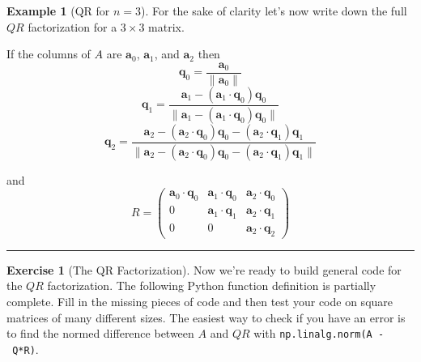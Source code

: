 \documentclass[
]{book}
\theoremstyle{definition}
\theoremstyle{definition}
\newtheorem{example}{Example}[chapter]
\theoremstyle{definition}
\newtheorem{exercise}{Exercise}[chapter]
\theoremstyle{remark}
\begin{document}
\begin{example}[QR for $n=3$]
\protect\hypertarget{exm:unnamed-chunk-349}{}{\label{exm:unnamed-chunk-349} {} }For the sake of clarity let's now write down the full \(QR\) factorization for a \(3 \times 3\) matrix.

If the columns of \(A\) are \(\boldsymbol{a}_0\), \(\boldsymbol{a}_1\), and \(\boldsymbol{a}_2\) then
\[ \boldsymbol{q}_0 = \frac{\boldsymbol{a}_0}{\|\boldsymbol{a}_0\|} \]
\[ \boldsymbol{q}_1 = \frac{ \boldsymbol{a}_1 - \left( \boldsymbol{a}_1 \cdot \boldsymbol{q}_0 \right) \boldsymbol{q}_0 }{\| \boldsymbol{a}_1 - \left( \boldsymbol{a}_1 \cdot \boldsymbol{q}_0 \right) \boldsymbol{q}_0 \|} \]
\[ \boldsymbol{q}_2 = \frac{ \boldsymbol{a}_2 - \left( \boldsymbol{a}_2 \cdot \boldsymbol{q}_0 \right) \boldsymbol{q}_0 - \left( \boldsymbol{a}_2 \cdot \boldsymbol{q}_1 \right) \boldsymbol{q}_1}{\| \boldsymbol{a}_2 - \left( \boldsymbol{a}_2 \cdot \boldsymbol{q}_0 \right) \boldsymbol{q}_0  - \left( \boldsymbol{a}_2 \cdot \boldsymbol{q}_1 \right) \boldsymbol{q}_1 \|} \]

and
\[ R = \begin{pmatrix} \boldsymbol{a}_0 \cdot \boldsymbol{q}_0 & \boldsymbol{a}_1 \cdot \boldsymbol{q}_0 & \boldsymbol{a}_2 \cdot \boldsymbol{q}_0 \\ 
0 & \boldsymbol{a}_1 \cdot \boldsymbol{q}_1 & \boldsymbol{a}_2 \cdot \boldsymbol{q}_1 \\ 0 & 0 & \boldsymbol{a}_2 \cdot \boldsymbol{q}_2 \end{pmatrix} \]
\end{example}

\begin{center}\rule{0.5\linewidth}{0.5pt}\end{center}

\begin{exercise}[The QR Factorization]
\protect\hypertarget{exr:qr}{}{\label{exr:qr} {} }Now we're ready to build general code for the \(QR\) factorization. The following Python function definition is partially complete. Fill in the missing pieces of code and then test your code on square matrices of many different sizes. The easiest way to check if you have an error is to find the normed difference between \(A\) and \(QR\) with \texttt{np.linalg.norm(A\ -\ Q*R)}.
\end{exercise}
\end{document}
